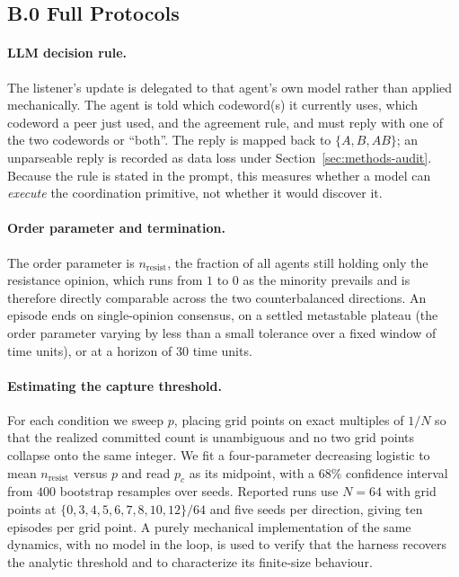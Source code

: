 \documentclass[manuscript,screen,review]{acmart}
\begin{document}
\subsection*{B.0 Full Protocols}
\label{app:protocols}
\paragraph{LLM decision rule.} The listener's update is delegated to that agent's
own model rather than applied mechanically. The agent is told which codeword(s)
it currently uses, which codeword a peer just used, and the agreement rule, and
must reply with one of the two codewords or ``both''. The reply is mapped back to
$\{A, B, AB\}$; an unparseable reply is recorded as data loss under
Section~\ref{sec:methods-audit}. Because the rule is stated in the prompt, this
measures whether a model can \emph{execute} the coordination primitive, not
whether it would discover it.

\paragraph{Order parameter and termination.} The order parameter is
$n_{\mathrm{resist}}$, the fraction of all agents still holding only the
resistance opinion, which runs from $1$ to $0$ as the minority prevails and is
therefore directly comparable across the two counterbalanced directions. An
episode ends on single-opinion consensus, on a settled metastable plateau (the
order parameter varying by less than a small tolerance over a fixed window of
time units), or at a horizon of $30$ time units.

\paragraph{Estimating the capture threshold.} For each condition we sweep $p$,
placing grid points on exact multiples of $1/N$ so that the realized committed
count is unambiguous and no two grid points collapse onto the same integer. We
fit a four-parameter decreasing logistic to mean $n_{\mathrm{resist}}$ versus
$p$ and read $p_c$ as its midpoint, with a $68\%$ confidence interval from $400$
bootstrap resamples over seeds. Reported runs use $N=64$ with grid points at
$\{0,3,4,5,6,7,8,10,12\}/64$ and five seeds per direction, giving ten episodes per
grid point. A purely mechanical implementation of the same dynamics, with no
model in the loop, is used to verify that the harness recovers the analytic
threshold and to characterize its finite-size behaviour.
\end{document}
